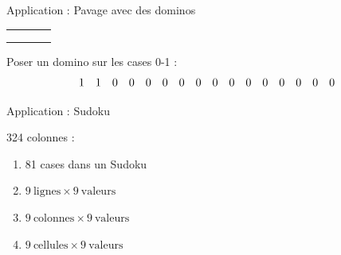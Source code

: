 \documentclass{beamer}
\begin{document}
\begin{frame}{Application : Pavage avec des dominos}

\begin{center}
  \begin{tabular}{|c|c|c|c|}
		\hline
   	\cellcolor{red} & \cellcolor{red} &  &  \\
		\hline
    	&  &  &  \\
		\hline
   	 &  &  &  \\
		\hline
   & &  &  \\
		\hline
\end{tabular}
\end{center}


Poser un domino sur les cases 0-1 :
\[
  \begin{array}{ c c c c c c c c c c c c c c c c }
	1 & 1 & 0 & 0 & 0 & 0 & 0 & 0 & 0 & 0 & 0 & 0 & 0 & 0 & 0 & 0 
  \end{array}
\]
\end{frame}



\begin{frame}{Application : Sudoku}

\begin{figure}[h]
\end{figure}

324 colonnes : 
\begin{enumerate}
\item 81 cases dans un Sudoku
\item $ 9~\textrm{lignes} \times 9~\textrm{valeurs}$ 
\item $ 9~\textrm{colonnes} \times 9~\textrm{valeurs}$ 
\item $ 9~\textrm{cellules} \times 9~\textrm{valeurs}$
\end{enumerate}



\end{frame}
\end{document}
